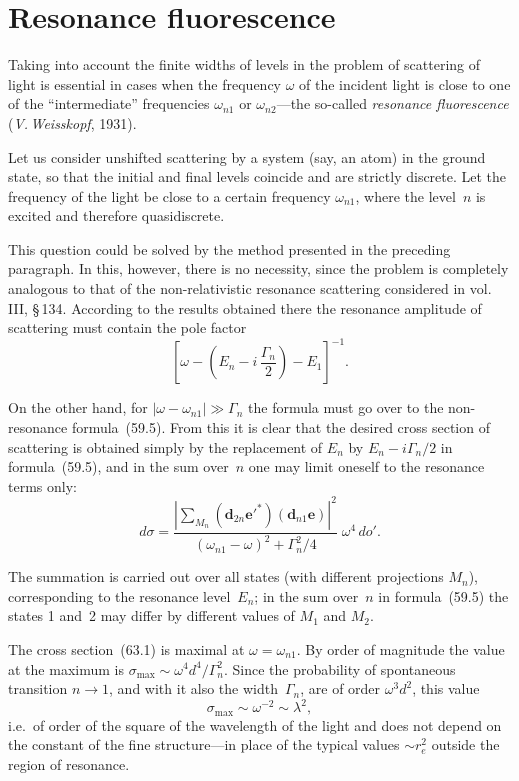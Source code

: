 \section{Resonance fluorescence}

Taking into account the finite widths of levels in the problem of scattering of light is essential in cases when the frequency $\omega$ of the incident light is close to one of the ``intermediate'' frequencies $\omega_{n1}$ or $\omega_{n2}$---the so-called \textit{resonance fluorescence} (\textit{V.\,Weisskopf}, 1931).

Let us consider unshifted scattering by a system (say, an atom) in the ground state, so that the initial and final levels coincide and are strictly discrete. Let the frequency of the light be close to a certain frequency $\omega_{n1}$, where the level~$n$ is excited and therefore quasidiscrete.

This question could be solved by the method presented in the preceding paragraph. In this, however, there is no necessity, since the problem is completely analogous to that of the non-relativistic resonance scattering considered in vol.\,III, \S\,134. According to the results obtained there the resonance amplitude of scattering must contain the pole factor
\[
\left[\omega - \left(E_n - i\,\frac{\Gamma_n}{2}\right) - E_1\right]^{-1}.
\]

On the other hand, for $|\omega - \omega_{n1}| \gg \Gamma_n$ the formula must go over to the non-resonance formula~(59.5). From this it is clear that the desired cross section of scattering is obtained simply by the replacement of $E_n$ by $E_n - i\Gamma_n/2$ in formula~(59.5), and in the sum over~$n$ one may limit oneself to the resonance terms only:
\begin{equation}
d\sigma = \frac{\left|\sum_{M_n}(\mathbf{d}_{2n}\mathbf{e}'^*)(\mathbf{d}_{n1}\mathbf{e})\right|^2}{(\omega_{n1} - \omega)^2 + \Gamma^2_n/4}\;\omega^4\,do'.
\tag{63.1}
\end{equation}

The summation is carried out over all states (with different projections $M_n$), corresponding to the resonance level~$E_n$; in the sum over~$n$ in formula~(59.5) the states 1 and~2 may differ by different values of $M_1$ and $M_2$.

The cross section~(63.1) is maximal at $\omega = \omega_{n1}$. By order of magnitude the value at the maximum is $\sigma_\mathrm{max} \sim \omega^4d^4/\Gamma^2_n$. Since the probability of spontaneous transition $n \to 1$, and with it also the width~$\Gamma_n$, are of order $\omega^3d^2$, this value
\begin{equation}
\sigma_\mathrm{max} \sim \omega^{-2} \sim \lambda^2,
\tag{63.2}
\end{equation}
i.e.\ of order of the square of the wavelength of the light and does not depend on the constant of the fine structure---in place of the typical values $\sim r^2_e$ outside the region of resonance.

